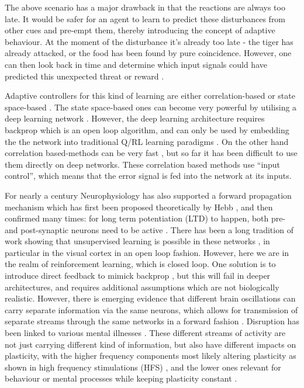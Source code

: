 \documentclass{aamas2018}
\begin{document}
The above scenario has a major drawback in that the reactions are
always too late. It would be safer for an agent to learn to predict
these disturbances from other cues and pre-empt them, thereby
introducing the concept of adaptive behaviour. At the moment of the
disturbance it's already too late - the tiger has already attacked, or
the food has been found by pure coincidence. However, one can then
look back in time and determine which input signals could have
predicted this unexpected threat or reward
\cite{Sutton87,Sutton98,Abbott01,NIPS2002_2245,PorrNecoInvco2003}.

Adaptive controllers for this kind of learning are either
correlation-based \cite{Klopf86,PorrNecoISO2003,Verschure91} or state
space-based \cite{Dayan1992,Sutton98}. The state space-based ones can
become very powerful by utilising a deep learning network
\cite{Guo2014}. However, the deep learning architecture requires backprop which
is an open loop algorithm, and can only be used by embedding the the network into traditional Q/RL learning
paradigms \cite{Dayan1992,Guo2014}. On the other hand correlation
based-methods can be very fast \cite{Porr2006ICO}, but so far it has
been difficult to use them directly on deep networks. These
correlation based methods use ``input control'', which means that the
error signal is fed into the network at its inputs.

For nearly a century Neurophysiology has also supported a forward
propagation mechanism which has first been proposed theoretically by
Hebb \cite{Hebb49}, and then confirmed many times: for long term
potentiation (LTD) to happen, both pre- and post-synaptic neurons need
to be active \cite{Luescher2012}.  There has been a long tradition of
work showing that unsupervised learning is possible in these networks
\cite{Linsker88}, in particular in the visual cortex \cite{Miller00}
in an open loop fashion. However, here we are in the realm of
reinforcement learning, which is closed loop. One solution is to
introduce direct feedback to mimick backprop \cite{Lillicrap2016}, but
this will fail in deeper architectures, and requires additional
assumptions which are not biologically realistic.  However, there is
emerging evidence that different brain oscillations can carry separate
information via the same neurons, which allows for transmission of separate
streams through the same networks in a forward fashion
\cite{Mizuhara2007,Canolty2010}. Disruption has been linked to
various mental illnesses \cite{Kim2016,Won2017}. These different
streams of activity are not just carrying different kind of
information, but also have different impacts on plasticity, with the
higher frequency components most likely altering plasticity as shown
in high frequency stimulations (HFS) \cite{Bliss73}, and the lower
ones relevant for behaviour or mental processes while keeping
plasticity constant \cite{Mizuhara2007}.
\end{document}
